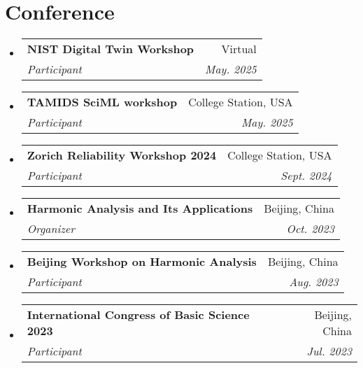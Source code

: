 \documentclass[a4paper,11pt]{article}
\makeatletter
\newcommand{\resumeItem}[2]{
  \item\small{
    \textbf{#1}{: #2 \vspace{-2pt}}
  }
}
\newcommand{\resumeSubheading}[4]{
  \vspace{-1pt}\item
    \begin{tabular*}{0.97\textwidth}{l@{\extracolsep{\fill}}r}
      \textbf{#1} & #2 \\
      \textit{#3} & \textit{#4} \\
    \end{tabular*}\vspace{-5pt}
}
\newcommand{\resumeSubItem}[2]{\resumeItem{#1}{#2}\vspace{-3pt}}
\newcommand{\resumeSubHeadingListStart}{\begin{itemize}[leftmargin=*]}
\newcommand{\resumeSubHeadingListEnd}{\end{itemize}}
\makeatother
\begin{document}

\vspace{1pt}

\section{\bfseries{Conference}}

\resumeSubHeadingListStart

\resumeSubheading
{NIST Digital Twin Workshop}{Virtual }
{Participant}{May. 2025}
\resumeSubheading
{TAMIDS SciML workshop}{College Station, USA }
{Participant}{May. 2025}
\resumeSubheading
{Zorich Reliability Workshop 2024}{College Station, USA }
{Participant}{Sept. 2024}
\resumeSubheading
{Harmonic Analysis and Its Applications}{Beijing, China}
{Organizer}{Oct. 2023}
\resumeSubheading
{Beijing Workshop on Harmonic Analysis}{Beijing, China}
{Participant}{Aug. 2023}
\resumeSubheading
{International Congress of Basic Science 2023}{Beijing, China}
{Participant}{Jul. 2023}
\resumeSubHeadingListEnd
\end{document}
